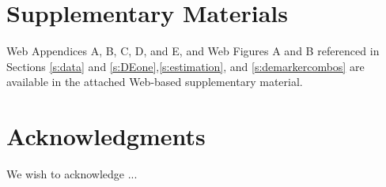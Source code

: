 \documentclass[useAMS,referee,usenatbib]{biom}
\begin{document}
\backmatter

\section*{Supplementary Materials}

Web Appendices A, B, C, D, and E, and Web Figures A and B referenced in Sections \ref{s:data} and \ref{s:DEone},\ref{s:estimation},  and \ref{s:demarkercombos} are available in the attached Web-based supplementary material.\vspace*{-8pt}

\section*{Acknowledgments}
We wish to acknowledge ...


\end{document}
